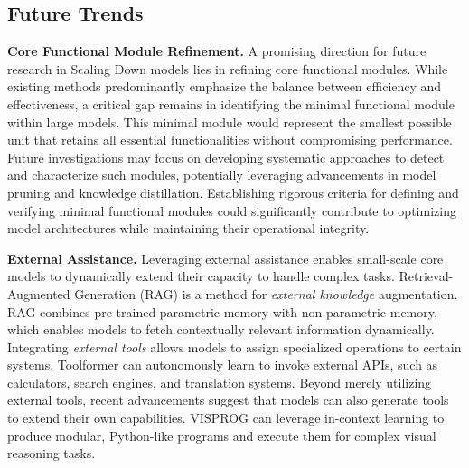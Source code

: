 \subsection{Future Trends}

    \textbf{Core Functional Module Refinement.}
    A promising direction for future research in Scaling Down models lies in refining core functional modules. While existing methods predominantly emphasize the balance between efficiency and effectiveness, a critical gap remains in identifying the minimal functional module within large models. This minimal module would represent the smallest possible unit that retains all essential functionalities without compromising performance. Future investigations may focus on developing systematic approaches to detect and characterize such modules, potentially leveraging advancements in model pruning and knowledge distillation. Establishing rigorous criteria for defining and verifying minimal functional modules could significantly contribute to optimizing model architectures while maintaining their operational integrity.
    
    \textbf{External Assistance.}
    Leveraging external assistance enables small-scale core models to dynamically extend their capacity to handle complex tasks. 
    Retrieval-Augmented Generation (RAG) \cite{lewis2020retrieval} is a method for \textit{external knowledge} augmentation. RAG combines pre-trained parametric memory with non-parametric memory,    which enables models to fetch contextually relevant information dynamically.
    Integrating \textit{external tools} allows models to assign specialized operations to certain systems.
    Toolformer \cite{schick2023toolformer} can autonomously learn to invoke external APIs, such as calculators, search engines, and translation systems.
    Beyond merely utilizing external tools, recent advancements suggest that models can also generate tools to extend their own capabilities. VISPROG \cite{gupta2023visual} can leverage in-context learning to produce modular, Python-like programs and execute them for complex visual reasoning tasks. 